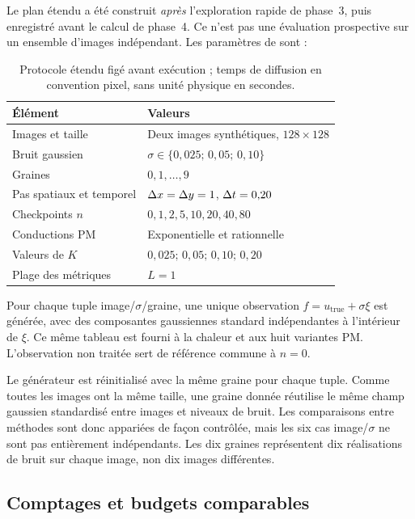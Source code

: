 Le plan étendu a été construit \emph{après} l'exploration rapide de
phase~3, puis enregistré avant le calcul de phase~4. Ce n'est pas une
évaluation prospective sur un ensemble d'images indépendant. Les
paramètres de  sont :
\begin{table}[htbp]
 \centering
 \caption{Protocole étendu figé avant exécution ; temps de diffusion en
 convention pixel, sans unité physique en secondes.}
 \label{tab:protocol}
 \begin{tabular}{ll}
  \toprule
  Élément & Valeurs \\
  \midrule
  Images et taille & Deux images synthétiques, $128\times128$ \\
  Bruit gaussien & $\sigma\in\{0{,}025;\,0{,}05;\,0{,}10\}$ \\
  Graines & $0,1,\ldots,9$ \\
  Pas spatiaux et temporel & $\Delta x=\Delta y=1$, $\Delta t=0{,}20$ \\
  Checkpoints $n$ & $0,1,2,5,10,20,40,80$ \\
  Conductions PM & Exponentielle et rationnelle \\
  Valeurs de $K$ & $0{,}025;\,0{,}05;\,0{,}10;\,0{,}20$ \\
  Plage des métriques & $L=1$ \\
  \bottomrule
 \end{tabular}
\end{table}

Pour chaque tuple image/$\sigma$/graine, une unique observation
$f=u_{\mathrm{true}}+\sigma\xi$ est générée, avec des composantes
gaussiennes standard indépendantes à l'intérieur de $\xi$. Ce même
tableau est fourni à la chaleur et aux huit variantes PM. L'observation
non traitée sert de référence commune à $n=0$.

Le générateur est réinitialisé avec la même graine pour chaque tuple.
Comme toutes les images ont la même taille, une graine donnée réutilise
le même champ gaussien standardisé entre images et niveaux de bruit.
Les comparaisons entre méthodes sont donc appariées de façon contrôlée,
mais les six cas image/$\sigma$ ne sont pas entièrement indépendants.
Les dix graines représentent dix réalisations de bruit sur chaque image,
non dix images différentes.

\subsection{Comptages et budgets comparables}

